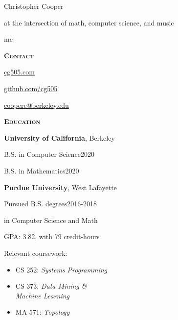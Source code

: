 \documentclass[11pt]{article}
\newcommand{\sectionfont}{\Large\scshape\bfseries\color{cg505green}}
\begin{document}
\vspace*{-10pt}
\begin{centering}
  \fontsize{50pt}{50pt}\selectfont
  \color{cg505green}
  Christopher Cooper

  \vspace{5pt}

  \fontsize{15pt}{15pt}\selectfont
  at the intersection of math, computer science, and music

\end{centering}

\vspace{20pt}

\begin{minipage}[t]{0.3\textwidth}
  {\Huge\color{black} me \phantom{my work}}

  \vspace{10pt}

  {\sectionfont Contact}
  \begin{adjustwidth}{10pt}{}
    \href{https://cg505.com/}{cg505.com}

    \href{https://github.com/cg505/}{github.com/cg505}

    \href{mailto:cooperc@berkeley.edu}{cooperc@berkeley.edu}
  \end{adjustwidth}

  \vspace{10pt}

  {\sectionfont Education}

  \textbf{University of California}, Berkeley
  \begin{adjustwidth}{10pt}{}
    B.S. in Computer Science\hfill2020

    B.S. in Mathematics\hfill2020
  \end{adjustwidth}

  \textbf{Purdue University}, West Lafayette
  \begin{adjustwidth}{10pt}{}
    Pursued B.S. degrees\hfill2016-2018

    \enskip in Computer Science and Math

    GPA: 3.82, with 79 credit-hours

    Relevant coursework:
    \begin{itemize}[leftmargin=*]
    \item CS 252: \emph{Systems Programming}
    \item CS 373: \emph{Data Mining \&}\\\phantom{CS 373:} \emph{Machine Learning}
    \item MA 571: \emph{Topology}
    \end{itemize}
  \end{adjustwidth}


\end{minipage}
\end{document}
